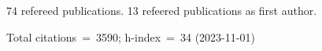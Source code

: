 74 refereed publications. 13 refeered publications as first author.

Total citations~=~3590; h-index~=~34 (2023-11-01)